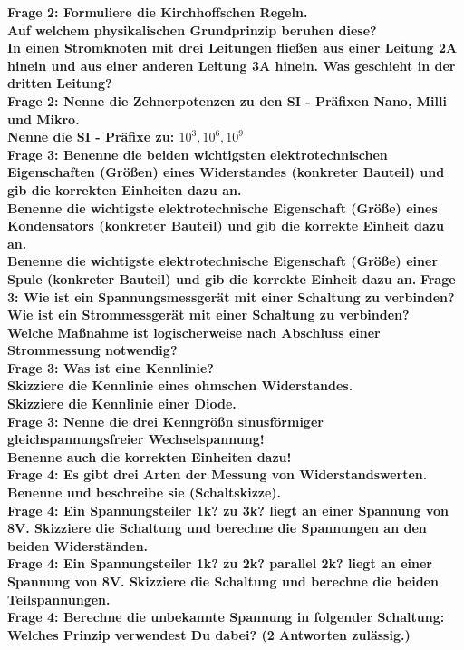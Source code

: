 \documentclass[11pt,a4paper]{scrartcl}
\begin{document}
\textbf{Frage 2: Formuliere die Kirchhoffschen Regeln.\\
Auf welchem physikalischen Grundprinzip beruhen diese?\\
In einen Stromknoten mit drei Leitungen fließen aus einer Leitung 2A hinein und aus einer anderen Leitung 3A hinein. Was geschieht in der dritten Leitung?}\\
\textbf{Frage 2: Nenne die Zehnerpotenzen zu den SI - Präfixen Nano, Milli und Mikro.\\
Nenne die SI - Präfixe zu: $10^3, 10^6, 10^9$}\\
\textbf{Frage 3: Benenne die beiden wichtigsten elektrotechnischen Eigenschaften (Größen) eines Widerstandes (konkreter Bauteil) und gib die korrekten Einheiten dazu an.\\
Benenne die wichtigste elektrotechnische Eigenschaft (Größe) eines Kondensators (konkreter Bauteil) und gib die korrekte Einheit dazu an.\\
Benenne die wichtigste elektrotechnische Eigenschaft (Größe) einer Spule (konkreter Bauteil) und gib die korrekte Einheit dazu an.}
\textbf{Frage 3: Wie ist ein Spannungsmessgerät mit einer Schaltung zu verbinden?\\
Wie ist ein Strommessgerät mit einer Schaltung zu verbinden?\\
Welche Maßnahme ist logischerweise nach Abschluss einer Strommessung notwendig?}\\
\textbf{Frage 3: Was ist eine Kennlinie?\\
Skizziere die Kennlinie eines ohmschen Widerstandes.\\
Skizziere die Kennlinie einer Diode.}\\
\textbf{Frage 3: Nenne die drei Kenngrößn sinusförmiger gleichspannungsfreier Wechselspannung!\\
Benenne auch die korrekten Einheiten dazu!}\\
\textbf{Frage 4: Es gibt drei Arten der Messung von Widerstandswerten. Benenne und beschreibe sie (Schaltskizze).}\\
\textbf{Frage 4: Ein Spannungsteiler 1k? zu 3k? liegt an einer Spannung von 8V. Skizziere die Schaltung und berechne die Spannungen an den beiden Widerständen.}\\
\textbf{Frage 4: Ein Spannungsteiler 1k? zu 2k? parallel 2k? liegt an einer Spannung von 8V. Skizziere die Schaltung und berechne die beiden Teilspannungen.}\\
\textbf{Frage 4: Berechne die unbekannte Spannung in folgender Schaltung: Welches Prinzip verwendest Du dabei? (2 Antworten zulässig.)}\\
\end{document}
